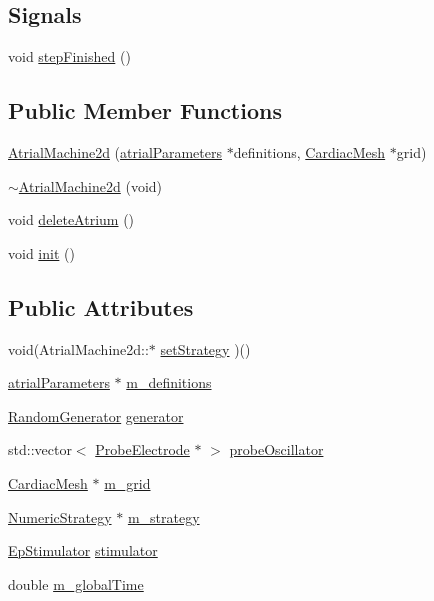 \subsection*{Signals}
\begin{DoxyCompactItemize}
\item 
void \hyperlink{class_atrial_machine2d_aa0503c0b65de1d0a3353fa60001b7c7b}{step\+Finished} ()
\end{DoxyCompactItemize}
\subsection*{Public Member Functions}
\begin{DoxyCompactItemize}
\item 
\hyperlink{class_atrial_machine2d_a1181b8a58b70e0374cfaefcbf2c29b12}{Atrial\+Machine2d} (\hyperlink{classatrial_parameters}{atrial\+Parameters} $\ast$definitions, \hyperlink{class_cardiac_mesh}{Cardiac\+Mesh} $\ast$grid)
\item 
\hyperlink{class_atrial_machine2d_a955b6614307d86c8d9e196a3b7ce2434}{$\sim$\+Atrial\+Machine2d} (void)
\item 
void \hyperlink{class_atrial_machine2d_a40366613671e5856d0c3cd0572398dc1}{delete\+Atrium} ()
\item 
void \hyperlink{class_atrial_machine2d_a22a0e5a3d07859721cce24ed253932ed}{init} ()
\end{DoxyCompactItemize}
\subsection*{Public Attributes}
\begin{DoxyCompactItemize}
\item 
void(Atrial\+Machine2d\+::$\ast$ \hyperlink{class_atrial_machine2d_aaeb0690b1fbd433bd0c25f2162b7b4bb}{set\+Strategy} )()
\item 
\hyperlink{classatrial_parameters}{atrial\+Parameters} $\ast$ \hyperlink{class_atrial_machine2d_aeafb998f5621fb19749014161d7d600d}{m\+\_\+definitions}
\item 
\hyperlink{class_random_generator}{Random\+Generator} \hyperlink{class_atrial_machine2d_a4ee41f8430aca76d5c6411cd37c92d38}{generator}
\item 
std\+::vector$<$ \hyperlink{class_probe_electrode}{Probe\+Electrode} $\ast$ $>$ \hyperlink{class_atrial_machine2d_a524fc9fd5d07a9f6f93611ee7839c99c}{probe\+Oscillator}
\item 
\hyperlink{class_cardiac_mesh}{Cardiac\+Mesh} $\ast$ \hyperlink{class_atrial_machine2d_ae5a4568a32980b04648791e7ac5e3249}{m\+\_\+grid}
\item 
\hyperlink{class_numeric_strategy}{Numeric\+Strategy} $\ast$ \hyperlink{class_atrial_machine2d_afa218ce1cafcf45895c0317953b97977}{m\+\_\+strategy}
\item 
\hyperlink{class_ep_stimulator}{Ep\+Stimulator} \hyperlink{class_atrial_machine2d_a932f19f3964c0bf8831fa4fc06a85ab6}{stimulator}
\item 
double \hyperlink{class_atrial_machine2d_a951f2f5f1bee9505ee93df61121bf5d2}{m\+\_\+global\+Time}
\end{DoxyCompactItemize}



